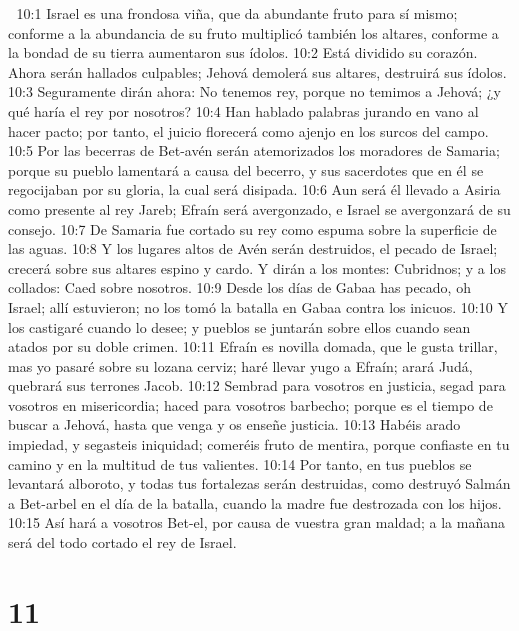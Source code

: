 
10:1 Israel es una frondosa viña, que da abundante fruto para sí mismo; conforme a la abundancia de su fruto multiplicó también los altares, conforme a la bondad de su tierra aumentaron sus ídolos.  
10:2 Está dividido su corazón. Ahora serán hallados culpables; Jehová demolerá sus altares, destruirá sus ídolos.  
10:3 Seguramente dirán ahora: No tenemos rey, porque no temimos a Jehová; ¿y qué haría el rey por nosotros?  
10:4 Han hablado palabras jurando en vano al hacer pacto; por tanto, el juicio florecerá como ajenjo en los surcos del campo.  
10:5 Por las becerras de Bet-avén serán atemorizados los moradores de Samaria; porque su pueblo lamentará a causa del becerro, y sus sacerdotes que en él se regocijaban por su gloria, la cual será disipada.  
10:6 Aun será él llevado a Asiria como presente al rey Jareb; Efraín será avergonzado, e Israel se avergonzará de su consejo.  
10:7 De Samaria fue cortado su rey como espuma sobre la superficie de las aguas.  
10:8 Y los lugares altos de Avén serán destruidos, el pecado de Israel; crecerá sobre sus altares espino y cardo. Y dirán a los montes: Cubridnos; y a los collados: Caed sobre nosotros. 
10:9 Desde los días de Gabaa has pecado, oh Israel; allí estuvieron; no los tomó la batalla en Gabaa contra los inicuos.  
10:10 Y los castigaré cuando lo desee; y pueblos se juntarán sobre ellos cuando sean atados por su doble crimen.  
10:11 Efraín es novilla domada, que le gusta trillar, mas yo pasaré sobre su lozana cerviz; haré llevar yugo a Efraín; arará Judá, quebrará sus terrones Jacob.  
10:12 Sembrad para vosotros en justicia, segad para vosotros en misericordia; haced para vosotros barbecho; porque es el tiempo de buscar a Jehová, hasta que venga y os enseñe justicia.  
10:13 Habéis arado impiedad, y segasteis iniquidad; comeréis fruto de mentira, porque confiaste en tu camino y en la multitud de tus valientes.  
10:14 Por tanto, en tus pueblos se levantará alboroto, y todas tus fortalezas serán destruidas, como destruyó Salmán a Bet-arbel en el día de la batalla, cuando la madre fue destrozada con los hijos.  
10:15 Así hará a vosotros Bet-el, por causa de vuestra gran maldad; a la mañana será del todo cortado el rey de Israel.  

\chapter{11}

